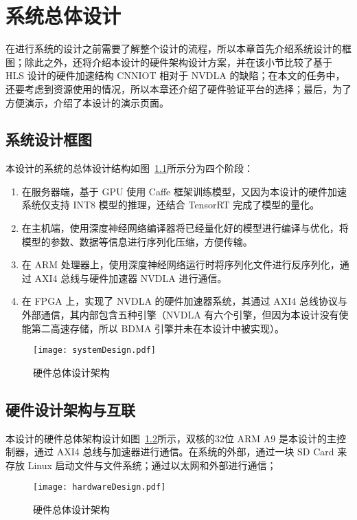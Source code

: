 \chapter{系统总体设计}\label{chap:systemoveral}

在进行系统的设计之前需要了解整个设计的流程，所以本章首先介绍系统设计的框图；除此之外，还将介绍本设计的硬件架构设计方案，并在该小节比较了基于 HLS 设计的硬件加速结构 CNNIOT 相对于 NVDLA 的缺陷；在本文的任务中，还要考虑到资源使用的情况，所以本章还介绍了硬件验证平台的选择；最后，为了方便演示，介绍了本设计的演示页面。

\section{系统设计框图}

本设计的系统的总体设计结构如图~\ref{fig:System Design}所示分为四个阶段：
\begin{enumerate}
    \item 在服务器端，基于 GPU 使用 Caffe 框架训练模型，又因为本设计的硬件加速系统仅支持 INT8 模型的推理，还结合 TensorRT 完成了模型的量化。
    \item 在主机端，使用深度神经网络编译器将已经量化好的模型进行编译与优化，将模型的参数、数据等信息进行序列化压缩，方便传输。
    \item 在 ARM 处理器上，使用深度神经网络运行时将序列化文件进行反序列化，通过 AXI4 总线与硬件加速器 NVDLA 进行通信。
    \item 在 FPGA 上，实现了 NVDLA 的硬件加速器系统，其通过 AXI4 总线协议与外部通信，其内部包含五种引擎（NVDLA 有六个引擎，但因为本设计没有使能第二高速存储，所以 BDMA 引擎并未在本设计中被实现）。
\end{enumerate}

\begin{figure}[!htbp]
    \centering
    \texttt{[image: systemDesign.pdf]}
    \caption{硬件总体设计架构}
    \label{fig:System Design}
\end{figure}

\section{硬件设计架构与互联}

本设计的硬件总体架构设计如图~\ref{fig:Hardware Design}所示，双核的32位 ARM A9 是本设计的主控制器，通过 AXI4 总线与加速器进行通信。在系统的外部，通过一块 SD Card 来存放 Linux 启动文件与文件系统；通过以太网和外部进行通信；

\begin{figure}[!htbp]
    \centering
    \texttt{[image: hardwareDesign.pdf]}
    \caption{硬件总体设计架构}
    \label{fig:Hardware Design}
\end{figure}

